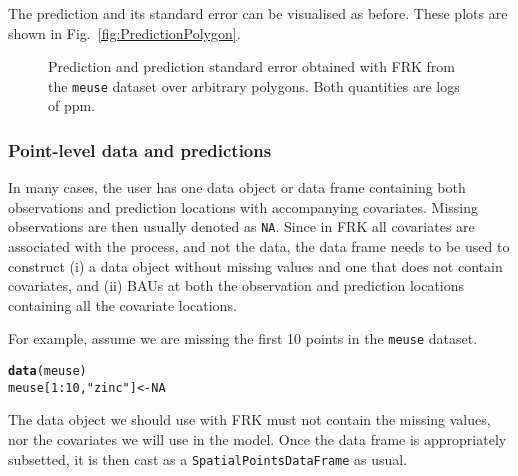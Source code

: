 \documentclass{article}\usepackage[]{graphicx}\usepackage[]{color}
\makeatletter
\newcommand{\hlnum}[1]{\textcolor[rgb]{0.686,0.059,0.569}{#1}}%
\newcommand{\hlstr}[1]{\textcolor[rgb]{0.192,0.494,0.8}{#1}}%
\newcommand{\hlopt}[1]{\textcolor[rgb]{0,0,0}{#1}}%
\newcommand{\hlstd}[1]{\textcolor[rgb]{0.345,0.345,0.345}{#1}}%
\newcommand{\hlkwb}[1]{\textcolor[rgb]{0.69,0.353,0.396}{#1}}%
\newcommand{\hlkwd}[1]{\textcolor[rgb]{0.737,0.353,0.396}{\textbf{#1}}}%
\newenvironment{kframe}{%
 \def\at@end@of@kframe{}%
 \ifinner\ifhmode%
  \def\at@end@of@kframe{\end{minipage}}%
  \begin{minipage}{\columnwidth}%
 \fi\fi%
 \def\FrameCommand##1{\hskip\@totalleftmargin \hskip-\fboxsep
 \colorbox{shadecolor}{##1}\hskip-\fboxsep
     \hskip-\linewidth \hskip-\@totalleftmargin \hskip\columnwidth}%
 \MakeFramed {\advance\hsize-\width
   \@totalleftmargin\z@ \linewidth\hsize
   \@setminipage}}%
 {\par\unskip\endMakeFramed%
 \at@end@of@kframe}
\newenvironment{knitrout}{}{} %
\renewcommand{\tt} {\texttt}
\let\code=\texttt
\newcommand{\pkg}[1]{{\fontseries{b}\selectfont #1}}
\makeatother
\begin{document}
\noindent The prediction and its standard error can be visualised as before. These plots are shown in Fig.~\ref{fig:PredictionPolygon}.

\begin{knitrout}
\color{fgcolor}\begin{figure}[t]
\caption{Prediction and prediction standard error obtained with FRK from the \tt{meuse} dataset over arbitrary polygons. Both quantities are logs of ppm.\label{fig:PredictionPolygon}}\label{fig:unnamed-chunk-19}
\end{figure}


\end{knitrout}


\subsubsection*{Point-level data and predictions}

In many cases, the user has one data object or data frame containing both observations and prediction locations with accompanying covariates. Missing observations are then usually denoted as \texttt{NA}. Since in \pkg{FRK} all covariates are associated with the process, and not the data, the data frame needs to be used to construct (i) a data object without missing values and one that does not contain covariates, and (ii) BAUs at both the observation and prediction locations containing all the covariate locations.

For example, assume we are missing the first 10 points in the \texttt{meuse} dataset.

\begin{knitrout}
\color{fgcolor}\begin{kframe}
\begin{alltt}
\hlkwd{data}\hlstd{(meuse)}
\hlstd{meuse[}\hlnum{1}\hlopt{:}\hlnum{10}\hlstd{,}\hlstr{"zinc"}\hlstd{]} \hlkwb{<-} \hlnum{NA}
\end{alltt}
\end{kframe}
\end{knitrout}

\noindent The data object we should use with \pkg{FRK} must not contain the missing values, nor the covariates we will use in the model. Once the data frame is appropriately subsetted, it is then cast as a \code{SpatialPointsDataFrame} as usual.
\end{document}
